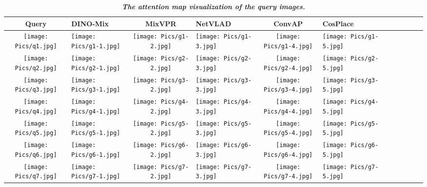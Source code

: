     \begin{table*}[!t]
    \renewcommand{\thetable}{5}
    \caption{\emph{\textbf{The attention map visualization of the query images.}}}
    \centering
    \begin{tabular}{ c p{2cm} c p{2cm} c p{2cm} c p{2cm} c p{2cm} c p{2cm}}
    \hline
    Query&DINO-Mix&MixVPR&NetVLAD&ConvAP&CosPlace\\
    \hline
 \texttt{[image: Pics/q1.jpg]}& \texttt{[image: Pics/g1-1.jpg]}&\texttt{[image: Pics/g1-2.jpg]}&\texttt{[image: Pics/g1-3.jpg]}&\texttt{[image: Pics/g1-4.jpg]}&\texttt{[image: Pics/g1-5.jpg]} \\
 \texttt{[image: Pics/q2.jpg]}& \texttt{[image: Pics/g2-1.jpg]}&\texttt{[image: Pics/g2-2.jpg]}&\texttt{[image: Pics/g2-3.jpg]}&\texttt{[image: Pics/g2-4.jpg]}&\texttt{[image: Pics/g2-5.jpg]} \\
 \texttt{[image: Pics/q3.jpg]}& \texttt{[image: Pics/g3-1.jpg]}&\texttt{[image: Pics/g3-2.jpg]}&\texttt{[image: Pics/g3-3.jpg]}&\texttt{[image: Pics/g3-4.jpg]}&\texttt{[image: Pics/g3-5.jpg]} \\
 \texttt{[image: Pics/q4.jpg]}& \texttt{[image: Pics/g4-1.jpg]}&\texttt{[image: Pics/g4-2.jpg]}&\texttt{[image: Pics/g4-3.jpg]}&\texttt{[image: Pics/g4-4.jpg]}&\texttt{[image: Pics/g4-5.jpg]} \\
 \texttt{[image: Pics/q5.jpg]}& \texttt{[image: Pics/g5-1.jpg]}&\texttt{[image: Pics/g5-2.jpg]}&\texttt{[image: Pics/g5-3.jpg]}&\texttt{[image: Pics/g5-4.jpg]}&\texttt{[image: Pics/g5-5.jpg]} \\
 \texttt{[image: Pics/q6.jpg]}& \texttt{[image: Pics/g6-1.jpg]}&\texttt{[image: Pics/g6-2.jpg]}&\texttt{[image: Pics/g6-3.jpg]}&\texttt{[image: Pics/g6-4.jpg]}&\texttt{[image: Pics/g6-5.jpg]} \\
 \texttt{[image: Pics/q7.jpg]}& \texttt{[image: Pics/g7-1.jpg]}&\texttt{[image: Pics/g7-2.jpg]}&\texttt{[image: Pics/g7-3.jpg]}&\texttt{[image: Pics/g7-4.jpg]}&\texttt{[image: Pics/g7-5.jpg]} \\

\end{tabular}
\end{table*}
